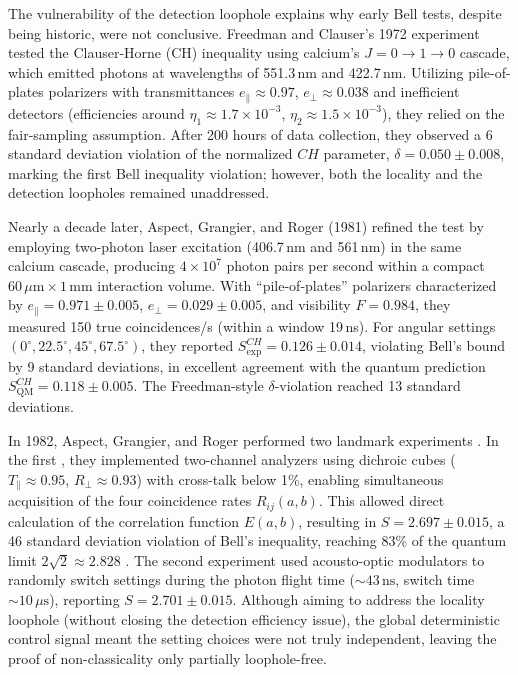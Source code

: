 \documentclass[aps,pra,reprint, superscriptaddress,showkeys]{revtex4-2}
\theoremstyle{plain}
\begin{document}
The vulnerability of the detection loophole explains why early Bell tests, despite being historic, were not conclusive. Freedman and Clauser's 1972 experiment \cite{Clauser1972} tested the Clauser-Horne (CH) inequality \cite{Clauser.Horne} using calcium's $J=0 \rightarrow 1 \rightarrow 0$ cascade, which emitted photons at wavelengths of 551.3\,nm and 422.7\,nm. Utilizing pile-of-plates polarizers with transmittances $e_\parallel \approx 0.97$, $e_\perp \approx 0.038$  and inefficient detectors (efficiencies around $\eta_1 \approx 1.7 \times 10^{-3}$, $\eta_2 \approx 1.5 \times 10^{-3}$), they relied on the fair-sampling assumption. After 200 hours of data collection, they observed a 6 standard deviation violation of the normalized $CH$ parameter, $\delta = 0.050 \pm 0.008$, marking the first Bell inequality violation; however, both the locality and the detection loopholes remained unaddressed.

Nearly a decade later, Aspect, Grangier, and Roger (1981) \cite{Aspect1981} refined the test by employing two-photon laser excitation (406.7\,nm and 561\,nm) in the same calcium cascade, 
producing $4 \times 10^7$ photon pairs per second within a compact $60\,\mu\text{m} \times 1\,\text{mm}$ interaction volume. With “pile-of-plates” polarizers characterized by $e_{\parallel} = 0.971 \pm 0.005$, $e_{\perp} = 0.029 \pm 0.005$, and visibility $F = 0.984$, they measured 150 true coincidences/s (within a window 19\,ns). For angular settings $(0^\circ, 22.5^\circ, 45^\circ, 67.5^\circ)$, they reported $S^{CH}_{\text{exp}} = 0.126 \pm 0.014$, violating Bell’s bound by 9 standard deviations, in excellent agreement with the quantum prediction $S^{CH}_{\text{QM}} = 0.118 \pm 0.005$. The Freedman-style $\delta$-violation reached 13 standard deviations.

In 1982, Aspect, Grangier, and Roger performed two landmark experiments \cite{Aspect1982b, Aspect1982}.
In the first \cite{Aspect1982b}, they implemented two-channel analyzers using dichroic cubes ($T_{\parallel} \approx 0.95$, $R_{\perp} \approx 0.93$) with cross-talk below 1\%, enabling simultaneous acquisition of the four coincidence rates $R_{ij}(a,b)$.
This allowed direct calculation of the correlation function $E(a,b)$, resulting in $S = 2.697 \pm 0.015$, a 46 standard deviation violation of Bell's inequality, reaching 83\% of the quantum limit $2\sqrt{2} \approx 2.828$ \cite{cirel1980quantum}.
The second experiment \cite{Aspect1982} used acousto-optic modulators to randomly switch settings during the photon flight time ($\sim 43\,\text{ns}$, switch time $\sim 10\,\mu\text{s}$), reporting $S = 2.701 \pm 0.015$. Although aiming to address the locality loophole (without closing the detection efficiency issue), the global deterministic control signal meant the setting choices were not truly independent, leaving the proof of non-classicality only partially loophole-free.
\end{document}
